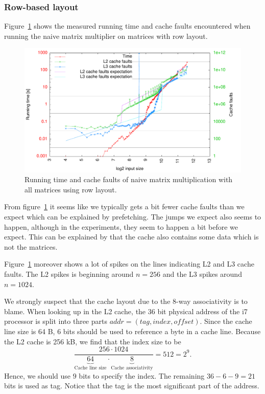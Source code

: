\subsubsection{Row-based layout}
Figure~\ref{fig:rnrnrn0} shows the measured running time and cache
faults encountered when running the naive matrix multiplier on
matrices with row layout.
\begin{figure}[h!]
  \centering
  \includegraphics[width=\textwidth]{plots/rowrow.pdf}
  \caption{Running time and cache faults of naive matrix
    multiplication with all matrices using row layout.}
  \label{fig:rnrnrn0}
\end{figure}

From figure~\ref{fig:rnrnrn0} it seems like we typically gets a bit fewer
cache faults than we expect which can be explained by prefetching. The jumps we expect
also seems to happen, although in the experiments, they seem to happen
a bit before we expect. This can be explained by that the cache also
contains some data which is not the matrices.

Figure~\ref{fig:rnrnrn0} moreover shows a lot of spikes on the lines
indicating L2 and L3 cache faults. The L2 spikes is beginning around
$n = 256$ and the L3 spikes around $n = 1024$.

We strongly suspect that the cache layout due to the 8-way
associativity is to blame. When looking up in the L2 cache, the 36 bit
physical address of the i7 processor is split into three parts $addr =
(tag,index,offset)$. Since the cache line size is 64 B, $6$ bits
should be used to reference a byte in a cache line. Because the L2
cache is 256 kB, we find that the index size to be
\[
  \frac{256 \cdot 1024}{\underbrace{64}_{\text{Cache line size}} \cdot \underbrace{8}_{\text{Cache associativity}}}
    = 512 = 2^9.
\]
Hence, we should use $9$ bits to specify the index. The remaining
$36-6-9=21$ bits is used as tag. Notice that the tag is the most
significant part of the address.

